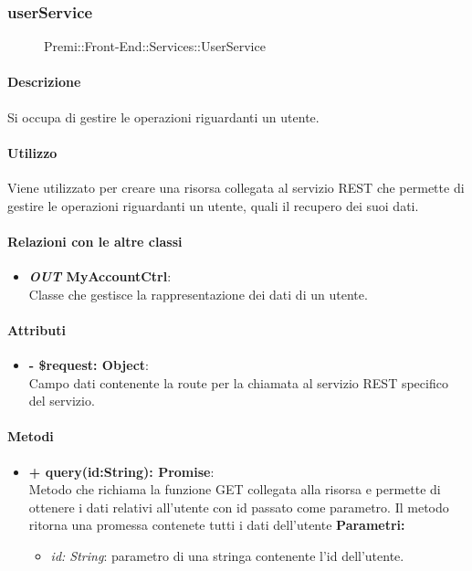 	
\subsubsection{userService}
	\begin{figure}[h]
		\centering
		\caption[Premi::Front-End::Services::UserService]{Premi::Front-End::Services::UserService}
	\end{figure}
	
	\paragraph{Descrizione}
	Si occupa di gestire le operazioni riguardanti un utente.
	
	\paragraph{Utilizzo}
	Viene utilizzato per creare una risorsa collegata al servizio REST che permette di gestire le operazioni riguardanti un utente, quali il recupero dei suoi dati.
	
	\paragraph{Relazioni con le altre classi}
	\begin{itemize}
		\item \textbf{\textit{OUT} MyAccountCtrl}:\\
			Classe che gestisce la rappresentazione dei dati di un utente.
	\end{itemize}
	
	\paragraph{Attributi}
	\begin{itemize}
		\item \textbf{- \$request: Object}:\\
		Campo dati contenente la route per la chiamata al servizio REST specifico del servizio.
	\end{itemize}	
	
	\paragraph{Metodi}
	\begin{itemize}
		\item \textbf{+ query(id:String): Promise}:\\
		Metodo che richiama la funzione GET collegata alla risorsa e permette di ottenere i dati relativi all'utente con id passato come parametro. Il metodo ritorna una promessa contenete tutti i dati dell'utente
		\textbf{Parametri:}\\
		\begin{itemize}
			\item \textit{id: String}: parametro di una stringa contenente l'id dell'utente.
		\end{itemize}
	\end{itemize}